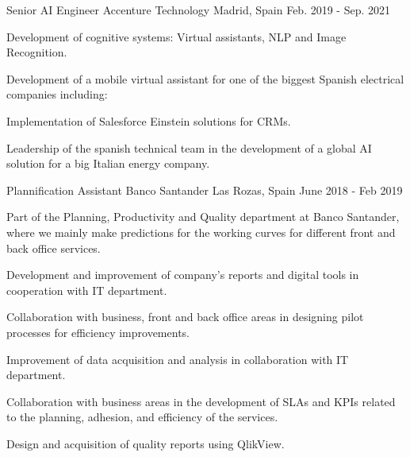 \begin{cventries}
    \cventry
    {Senior AI Engineer} %
    {Accenture Technology} %
    {Madrid, Spain} %
    {Feb. 2019 - Sep. 2021} %
    {
        \begin{cvitems} %
            \item {Development of cognitive systems: Virtual assistants, NLP and Image Recognition.}
            \item {Development of a mobile virtual assistant for one of the biggest Spanish electrical companies including: }
            \item {Implementation of Salesforce Einstein solutions for CRMs.}
            \item {Leadership of the spanish technical team in the development of a global AI solution for a big Italian energy company.}
        \end{cvitems}
    }

    \cventry
    {Plannification Assistant} %
    {Banco Santander} %
    {Las Rozas, Spain} %
    {June 2018 - Feb 2019} %
    {
        \begin{cvitems} %
            \item {Part of the Planning, Productivity and Quality department at Banco Santander, where we mainly make predictions for the working curves for different front and back office services.}
            \item {Development and improvement of company’s reports and digital tools in cooperation with IT department.}
            \item {Collaboration with business, front and back office areas in designing pilot processes for efficiency improvements.}
            \item {Improvement of data acquisition and analysis in collaboration with IT department.}
            \item {Collaboration with business areas in the development of SLAs and KPIs related to the planning, adhesion, and efficiency of the services.}
            \item {Design and acquisition of quality reports using QlikView.}
        \end{cvitems}
    }

\end{cventries}
